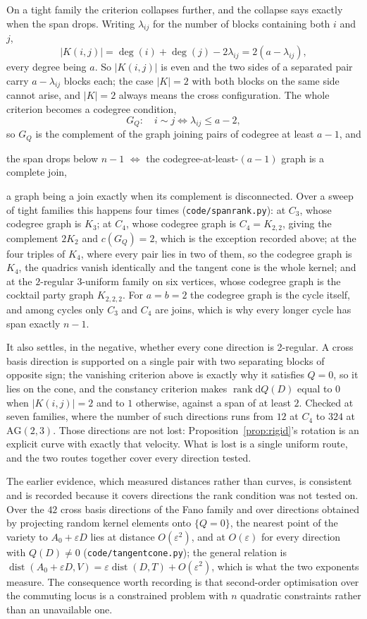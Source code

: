 \documentclass[11pt]{article}
\theoremstyle{remark}
\begin{document}
On a tight family the criterion collapses further, and the collapse says exactly when the span drops.
Writing $\lambda_{ij}$ for the number of blocks containing both $i$ and $j$,
\[
|K(i,j)|=\deg(i)+\deg(j)-2\lambda_{ij}=2(a-\lambda_{ij}),
\]
every degree being $a$. So $|K(i,j)|$ is even and the two sides of a separated pair carry
$a-\lambda_{ij}$ blocks each; the case $|K|=2$ with both blocks on the same side cannot arise, and
$|K|=2$ always means the cross configuration. The whole criterion becomes a codegree condition,
\[
G_Q:\quad i\sim j\iff\lambda_{ij}\le a-2,
\]
so $G_Q$ is the complement of the graph joining pairs of codegree at least $a-1$, and
\begin{center}
the span drops below $n-1$ $\iff$ the codegree-at-least-$(a-1)$ graph is a complete join,
\end{center}
a graph being a join exactly when its complement is disconnected. Over a sweep of tight families
this happens four times (\texttt{code/spanrank.py}): at $C_3$, whose codegree graph is $K_3$; at
$C_4$, whose codegree graph is $C_4=K_{2,2}$, giving the complement $2K_2$ and $c(G_Q)=2$, which is
the exception recorded above; at the four triples of $K_4$, where every pair lies in two of them, so
the codegree graph is $K_4$, the quadrics vanish identically and the tangent cone is the whole
kernel; and at the $2$-regular $3$-uniform family on six vertices, whose codegree graph is the
cocktail party graph $K_{2,2,2}$. For $a=b=2$ the codegree graph is the cycle itself, and among
cycles only $C_3$ and $C_4$ are joins, which is why every longer cycle has span exactly $n-1$.

It also settles, in the negative, whether every cone direction is 2-regular. A cross basis direction
is supported on a single pair with two separating blocks of opposite sign; the vanishing criterion
above is exactly why it satisfies $Q=0$, so it lies on the cone, and the constancy criterion makes
$\operatorname{rank}\mathrm dQ(D)$ equal to $0$ when $|K(i,j)|=2$ and to $1$ otherwise, against a span
of at least $2$. Checked at seven families, where the number of such directions runs from $12$ at
$C_4$ to $324$ at $\mathrm{AG}(2,3)$. Those directions are not lost: Proposition~\ref{prop:rigid}'s
rotation is an explicit curve with exactly that velocity. What is lost is a single uniform route,
and the two routes together cover every direction tested.

The earlier evidence, which measured distances rather than curves, is consistent and is recorded
because it covers directions the rank condition was not tested on. Over the $42$ cross basis
directions of the Fano family and
over directions obtained by projecting random kernel elements onto $\{Q=0\}$, the nearest point of
the variety to $A_0+\varepsilon D$ lies at distance $O(\varepsilon^2)$, and at $O(\varepsilon)$ for
every direction with $Q(D)\neq0$ (\texttt{code/tangentcone.py}); the general relation is
$\operatorname{dist}(A_0+\varepsilon D,V)=\varepsilon\operatorname{dist}(D,T)+O(\varepsilon^2)$,
which is what the two exponents measure. The consequence worth recording is that second-order
optimisation over the commuting locus is a constrained problem with $n$ quadratic constraints
rather than an unavailable one.
\end{document}
